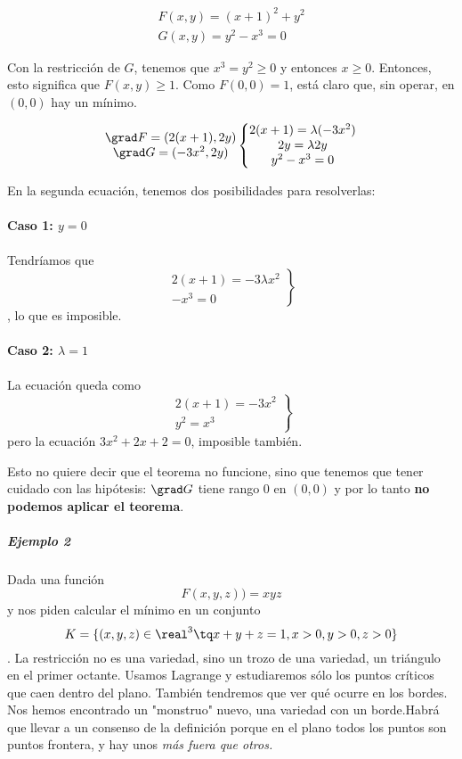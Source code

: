 \begin{gather*}
F(x,y) = (x+1)^2+y^2 \\
G(x,y) = y^2-x^3 = 0 
\end{gather*}

Con la restricción de $G$, tenemos que $x^3=y^2≥0$ y entonces $x≥0$. Entonces, esto significa que $F(x,y) ≥ 1$. Como $F(0,0)=1$, está claro que, sin operar, en $(0,0)$ hay un mínimo.

\[
\begin{matrix}
\grad F= (2(x+1), 2y) \\
\grad G = (-3x^2, 2y)
\end{matrix}
\left\lbrace
\begin{matrix}
2(x+1)=\lambda(-3x^2)\\
2y=\lambda 2y\\
y^2-x^3 = 0
\end{matrix}
\right.
\]

En la segunda ecuación, tenemos dos posibilidades para resolverlas:

\paragraph{Caso 1: $y=0$}

Tendríamos que \[\left.\begin{matrix}2(x+1)=-3\lambda x^2 \\ -x^3 = 0\end{matrix}\right\rbrace \], lo que es imposible.

\paragraph{Caso 2: $\lambda = 1$}

La ecuación queda como \[\left.\begin{matrix}2(x+1)=-3x^2 \\ y^2=x^3 \end{matrix}\right\rbrace \] pero  la ecuación $3x^2+2x+2=0$, imposible también.

Esto no quiere decir que el teorema no funcione, sino que tenemos que tener cuidado con las hipótesis: $\grad G$ tiene rango 0 en $(0,0)$  y por lo tanto \textbf{no podemos aplicar el teorema}.
\subparagraph{Ejemplo 2}
Dada una función \[ F(x,y,z))=xyz \] y nos piden calcular el mínimo en un conjunto \[ K=\{(x,y,z)\in\real^3\tq x+y+z=1,x>0,y>0,z>0\} \]. La restricción no es una variedad, sino un trozo de una variedad, un triángulo en el primer octante. Usamos Lagrange y estudiaremos sólo los puntos críticos que caen dentro del plano. También tendremos que ver qué ocurre en los bordes. Nos hemos encontrado un "monstruo" nuevo, una variedad con un borde.Habrá que llevar a un consenso de la definición porque en el plano todos los puntos son puntos frontera, y hay unos \textit{más fuera que otros.} 

